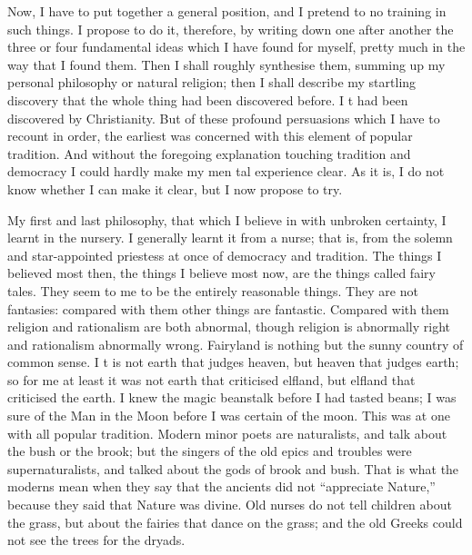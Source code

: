 \documentclass{book}
\begin{document}
Now, I have to put together a general position, and I pretend to no training in such things. I propose to do it, therefore, by writing down one after another the three or four fundamental ideas which I have found for myself, pretty much in the way that I found them. Then I shall roughly synthesise them, summing up my personal philosophy or natural religion; then I shall describe my startling discovery that the whole thing had been discovered before. I t had been discovered by Christianity. But of these profound persuasions which I have to recount in order, the earliest was concerned with this element of popular tradition. And without the foregoing explanation touching tradition and democracy I could hardly make my men tal experience clear. As it is, I do not know whether I can make it clear, but I now propose to try.

My first and last philosophy, that which I believe in with unbroken certainty, I learnt in the nursery. I generally learnt it from a nurse; that is, from the solemn and star-appointed priestess at once of democracy and tradition. The things I believed most then, the things I believe most now, are the things called fairy tales. They seem to me to be the entirely reasonable things. They are not fantasies: compared with them other things are fantastic. Compared with them religion and rationalism are both abnormal, though religion is abnormally right and rationalism abnormally wrong. Fairyland is nothing but the sunny country of common sense. I t is not earth that judges heaven, but heaven that judges earth; so for me at least it was not earth that criticised elfland, but elfland that criticised the earth. I knew the magic beanstalk before I had tasted beans; I was sure of the Man in the Moon before I was certain of the moon. This was at one with all popular tradition. Modern minor poets are naturalists, and talk about the bush or the brook; but the singers of the old epics and troubles were supernaturalists, and talked about the gods of brook and bush. That is what the moderns mean when they say that the ancients did not “appreciate Nature,” because they said that Nature was divine. Old nurses do not tell children about the grass, but about the fairies that dance on the grass; and the old Greeks could not see the trees for the dryads.
\end{document}
